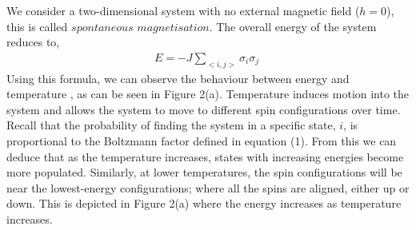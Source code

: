 \documentclass[a4paper]{article}
\begin{document}
We consider a two-dimensional system with no external magnetic field ($h=0$), this is called $spontaneous$ $magnetisation$. The overall energy of the system reduces to,
\begin{align}
E = -J\sum_{<i,j>} \sigma_{i}\sigma_{j} \
\end{align}
Using this formula, we can observe the behaviour between energy and temperature \cite{8}, as can be seen in Figure 2(a). Temperature induces motion into the system and allows the system to move to different spin configurations over time. Recall that the probability of finding the system in a specific state, $i$, is proportional to the Boltzmann factor defined in equation (1). From this we can deduce that as the temperature increases, states with increasing energies become more populated. Similarly, at lower temperatures, the spin configurations will be near the lowest-energy configurations; where all the spins are aligned, either up or down. This is depicted in Figure 2(a) where the energy increases as temperature increases.
\end{document}
